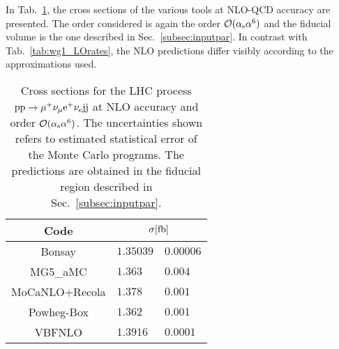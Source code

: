 In Tab.~\ref{tab:wg1_NLOrates}, the cross sections of the various tools at NLO-QCD accuracy are presented.
The order considered is again the order $\mathcal{O}(\alpha_{\rm s}\alpha^6)$ and the fiducial volume is the one described in Sec.~\ref{subsec:inputpar}.
In contrast with Tab.~\ref{tab:wg1_LOrates}, the NLO predictions differ visibly according to the approximations used.

\begin{table}[h!]
    \centering
    \begin{tabular}{c|r@{ $\pm$ }l}
      Code  &  \multicolumn{2}{c}{$\sigma[\rm{fb}]$}  \\
        \hline
        \hline
        {\sc Bonsay}  &  $1.35039$ & $0.00006$  \\
        {\sc MG5\_aMC}&  $1.363\phantom{0}\phantom{0}$ & $0.004$  \\
        {\sc MoCaNLO+Recola}  &  $ 1.378\phantom{0}\phantom{0}$ & $0.001$ \\
        {\sc Powheg-Box}  &  $1.362\phantom{0}\phantom{0}$  & $0.001$   \\
        {\sc VBFNLO}  &  $1.3916\phantom{0}$ & $0.0001$  \\
    \end{tabular}
    \caption{\label{tab:wg1_NLOrates} Cross sections for the LHC process ${\rm p}{\rm p}\to\mu^+\nu_\mu{\rm e}^+\nu_{\rm e}{\rm j}{\rm j}$ at NLO accuracy and order $\mathcal{O}(\alpha_\text{s}\alpha^6)$.
    The uncertainties shown refers to estimated statistical error of the Monte Carlo programs.
    The predictions are obtained in the fiducial region described in Sec.~\ref{subsec:inputpar}.
    }
\end{table}


